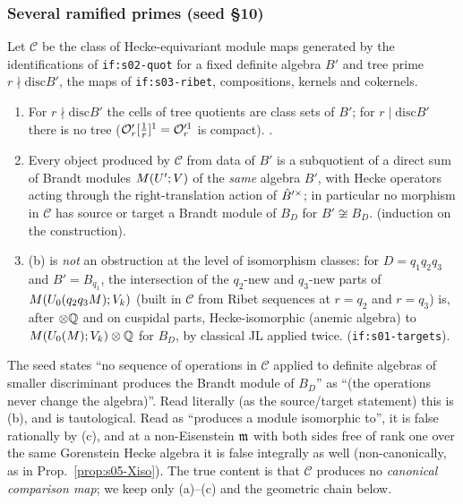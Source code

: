 \subsubsection{Several ramified primes (seed \S10)}\label{sss:s05-general}
\begin{proposition}\label{prop:s05-nochain}
Let $\mathcal C$ be the class of Hecke-equivariant module maps generated by the identifications of \texttt{if:s02-quot} for a
fixed definite algebra $B'$ and tree prime $r\nmid\mathrm{disc}B'$, the maps of \texttt{if:s03-ribet}, compositions, kernels and
cokernels.
\begin{enumerate}[label=(\alph*)]
\item For $r\nmid\mathrm{disc}B'$ the cells of tree quotients are class sets of $B'$; for $r\mid\mathrm{disc}B'$ there is no tree
  ($\mathcal{O}'_r[\frac1r]^1=\mathcal{O}'^1_r$ is compact). \stproved.
\item Every object produced by $\mathcal C$ from data of $B'$ is a subquotient of a direct sum of Brandt modules
  $M(U';V)$ of the \emph{same} algebra $B'$, with Hecke operators acting through the right-translation action of
  $\hat{B}'^\times$; in particular no morphism in $\mathcal C$ has source or target a Brandt module of $B_D$ for $B'\not\cong B_D$.
  \stproved{} (induction on the construction).
\item (b) is \emph{not} an obstruction at the level of isomorphism classes: for $D=q_1q_2q_3$ and $B'=B_{q_1}$, the
  intersection of the $q_2$-new and $q_3$-new parts of $M(U_0(q_2q_3M);V_k)$ (built in $\mathcal C$ from Ribet
  sequences at $r=q_2$ and $r=q_3$) is, after $\otimes\mathbb{Q}$ and on cuspidal parts, Hecke-isomorphic (anemic algebra) to
  $M(U_0(M);V_k)\otimes\mathbb{Q}$ for $B_D$, by classical JL applied twice. \stpmc{} (\texttt{if:s01-targets}).
\end{enumerate}
\end{proposition}
\begin{remark}\label{rem:s05-nochain}
The seed states ``no sequence of operations in $\mathcal C$ applied to definite algebras of smaller discriminant produces the
Brandt module of $B_D$'' as \stproved{} ``(the operations never change the algebra)''. Read literally (as the source/target
statement) this is (b), and is tautological. Read as ``produces a module isomorphic to'', it is false rationally by (c), and at a
non-Eisenstein $\mathfrak{m}$ with both sides free of rank one over the same Gorenstein Hecke algebra it is false integrally as well
(non-canonically, as in Prop.~\ref{prop:s05-Xiso}). The true content is that $\mathcal C$ produces no \emph{canonical
comparison map}; we keep only (a)--(c) and the geometric chain below.
\end{remark}
